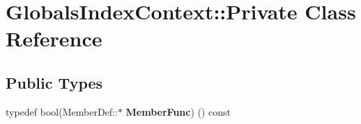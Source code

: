 \hypertarget{class_globals_index_context_1_1_private}{}\section{Globals\+Index\+Context\+::Private Class Reference}
\label{class_globals_index_context_1_1_private}
\subsection*{Public Types}
\begin{DoxyCompactItemize}
\item 
\mbox{\label{class_globals_index_context_1_1_private_afd0770165b0b214d1604ac0eea315b24}} 
typedef bool(Member\+Def\+::$\ast$ {\bfseries Member\+Func}) () const
\end{DoxyCompactItemize}
